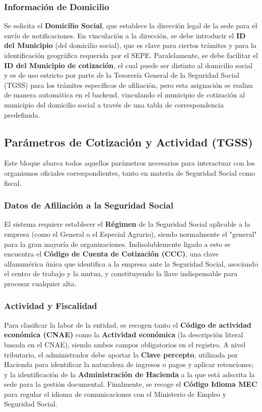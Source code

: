 \subsubsection{Información de Domicilio}
Se solicita el \textbf{Domicilio Social}, que establece la dirección legal de la sede para el envío de notificaciones. En vinculación a la dirección, se debe introducir el \textbf{ID del Municipio} (del domicilio social), que es clave para ciertos trámites y para la identificación geográfica requerida por el SEPE. Paralelamente, se debe facilitar el \textbf{ID del Municipio de cotización}, el cual puede ser distinto al domicilio social y es de uso estricto por parte de la Tesorería General de la Seguridad Social (TGSS) para los trámites específicos de afiliación, pero esta asignación se realiza de manera automática en el backend, vinculando el municipio de cotización al municipio del domicilio social a través de una tabla de correspondencia predefinida.

\subsection{Parámetros de Cotización y Actividad (TGSS)}

Este bloque abarca todos aquellos parámetros necesarios para interactuar con los organismos oficiales correspondientes, tanto en materia de Seguridad Social como fiscal.

\subsubsection{Datos de Afiliación a la Seguridad Social}
El sistema requiere establecer el \textbf{Régimen} de la Seguridad Social aplicable a la empresa (como el General o el Especial Agrario), siendo normalmente el "general" para la gran mayoría de organizaciones. Indisolublemente ligado a esto se encuentra el \textbf{Código de Cuenta de Cotización (CCC)}, una clave alfanumérica única que identifica a la empresa ante la Seguridad Social, asociando el centro de trabajo y la mutua, y constituyendo la llave indispensable para procesar cualquier alta.

\subsubsection{Actividad y Fiscalidad}
Para clasificar la labor de la entidad, se recogen tanto el \textbf{Código de actividad económica (CNAE)} como la \textbf{Actividad económica} (la descripción literal basada en el CNAE), siendo ambos campos obligatorios en el registro. A nivel tributario, el administrador debe aportar la \textbf{Clave percepto}, utilizada por Hacienda para identificar la naturaleza de ingresos o pagos y aplicar retenciones; y la identificación de la \textbf{Administración de Hacienda} a la que está adscrita la sede para la gestión documental. Finalmente, se recoge el \textbf{Código Idioma MEC} para regular el idioma de comunicaciones con el Ministerio de Empleo y Seguridad Social.

